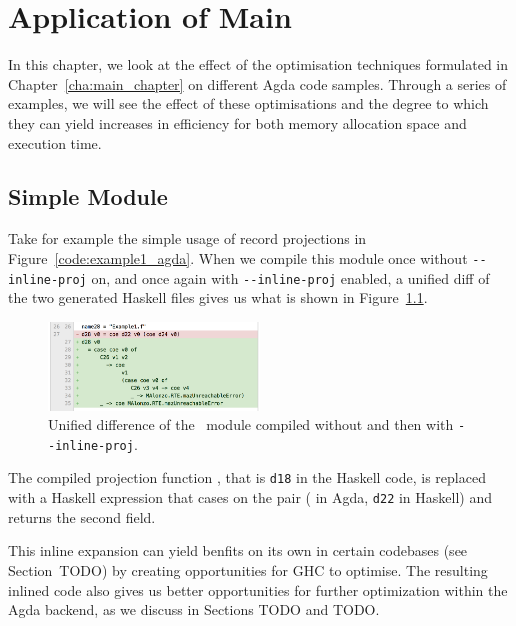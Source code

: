 \chapter{Application of Main}
\label{cha:application_of_main}

In this chapter, we look at the effect of the optimisation techniques formulated in Chapter~\ref{cha:main_chapter} on different Agda code samples. Through a series of examples, we will see the effect of these optimisations and the degree to which they can yield increases in efficiency for both memory allocation space and execution time.

\section{Simple Module}



Take for example the simple usage of record projections in Figure~\ref{code:example1_agda}. When we compile this module once without \texttt{-{}-inline-proj} on, and once again with \texttt{-{}-inline-proj} enabled, a unified diff of the two generated Haskell files gives us what is shown in Figure~\ref{fig:Example1_inline}.

\begin{figure}
    \centering
    \includegraphics[width=0.5\textwidth]{Figures/Example1_inline}
    \caption{Unified difference of the ~module compiled without and then with \texttt{-{}-inline-proj}.}
    \label{fig:Example1_inline}
\end{figure}

The compiled projection function , that is \lstinline{d18} in the Haskell code, is replaced with a Haskell expression that cases on the pair ( in Agda, \lstinline{d22} in Haskell) and returns the second field.


This inline expansion can yield benfits on its own in certain codebases (see Section~TODO) by creating opportunities for GHC to optimise. The resulting inlined code also gives us better opportunities for further optimization within the Agda backend, as we discuss in Sections TODO and TODO.

